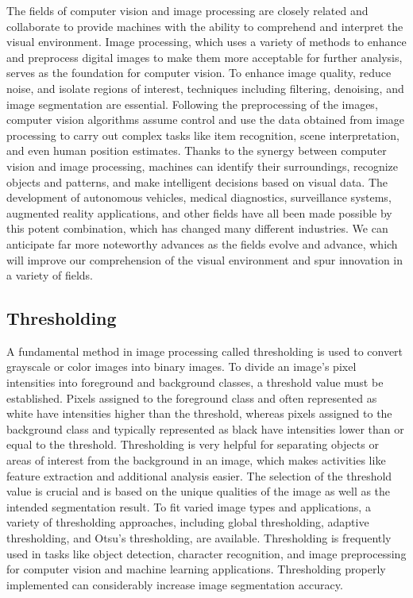 \documentclass[a4paper,11pt]{report}%
\renewcommand{\\}{\vspace*{0.5\baselineskip} \newline}
\begin{document}
The fields of computer vision and image processing are closely related and collaborate to provide machines with the ability to comprehend and interpret the visual environment. Image processing, which uses a variety of methods to enhance and preprocess digital images to make them more acceptable for further analysis, serves as the foundation for computer vision. To enhance image quality, reduce noise, and isolate regions of interest, techniques including filtering, denoising, and image segmentation are essential. Following the preprocessing of the images, computer vision algorithms assume control and use the data obtained from image processing to carry out complex tasks like item recognition, scene interpretation, and even human position estimates.
Thanks to the synergy between computer vision and image processing, machines can identify their surroundings, recognize objects and patterns, and make intelligent decisions based on visual data. The development of autonomous vehicles, medical diagnostics, surveillance systems, augmented reality applications, and other fields have all been made possible by this potent combination, which has changed many different industries. We can anticipate far more noteworthy advances as the fields evolve and advance, which will improve our comprehension of the visual environment and spur innovation in a variety of fields.

\subsection{Thresholding}
A fundamental method in image processing called thresholding is used to convert grayscale or color images into binary images. To divide an image's pixel intensities into foreground and background classes, a threshold value must be established. Pixels assigned to the foreground class and often represented as white have intensities higher than the threshold, whereas pixels assigned to the background class and typically represented as black have intensities lower than or equal to the threshold. Thresholding is very helpful for separating objects or areas of interest from the background in an image, which makes activities like feature extraction and additional analysis easier. The selection of the threshold value is crucial and is based on the unique qualities of the image as well as the intended segmentation result.
To fit varied image types and applications, a variety of thresholding approaches, including global thresholding, adaptive thresholding, and Otsu's thresholding, are available. Thresholding is frequently used in tasks like object detection, character recognition, and image preprocessing for computer vision and machine learning applications. Thresholding properly implemented can considerably increase image segmentation accuracy.
\end{document}
